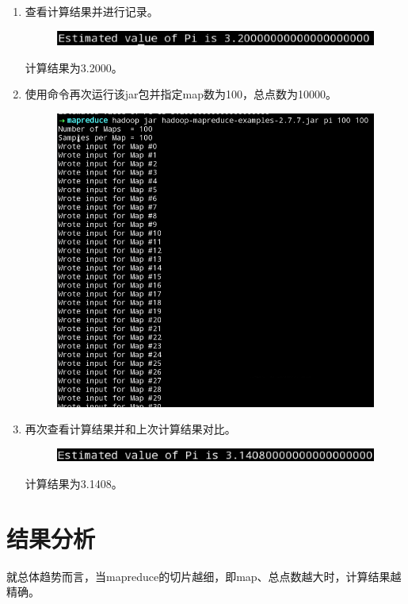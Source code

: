 \documentclass {article}
\begin{document}
\begin{enumerate}
				\item 查看计算结果并进行记录。
				\begin{figure}[H]
					\centering
					\includegraphics{figures/fig46.png}
				\end{figure}
				
				计算结果为3.2000。
				\item 使用命令再次运行该jar包并指定map数为100，总点数为10000。
				\begin{figure}[H]
					\centering
					\includegraphics[width=4.5in]{figures/fig47.png}
				\end{figure}
			
				\item 再次查看计算结果并和上次计算结果对比。
				\begin{figure}[H]
					\centering
					\includegraphics{figures/fig48.png}
				\end{figure}
			
				计算结果为3.1408。
			\end{enumerate}

	\section{结果分析}
		就总体趋势而言，当mapreduce的切片越细，即map、总点数越大时，计算结果越精确。
	
\end{document}
